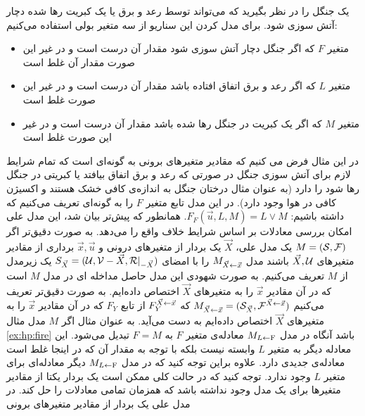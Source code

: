 \begin{example}
      \label{ex:hp:fire}
      یک جنگل را در نظر بگیرید که می‌تواند توسط رعد و برق یا یک کبریت رها شده دچار آتش سوزی شود.
      برای مدل کردن این سناریو از سه متغیر بولی
      استفاده می‌کنیم:
      \begin{itemize}
            \item متغیر
                  $F$
                  که اگر جنگل دچار آتش سوزی شود مقدار آن درست است و در غیر این صورت مقدار آن غلط است
            \item متغیر
                  $L$
                  که اگر رعد و برق اتفاق افتاده باشد مقدار آن درست است و در غیر این صورت غلط است
            \item متغیر
                  $M$
                  که اگر یک کبریت در جنگل رها شده باشد مقدار آن درست است و در غیر این صورت غلط است
      \end{itemize}
\end{example}
در این مثال فرض می کنیم که مقادیر متغیر‌های برونی به گونه‌ای است که تمام شرایط لازم برای آتش سوزی جنگل در صورتی که رعد و برق اتفاق بیافتد یا کبریتی در جنگل رها شود را دارد
(به عنوان مثال درختان جنگل به اندازه‌ی کافی خشک هستند و اکسیژن کافی در هوا وجود دارد).
در این مدل تابع متغیر
$F$
را به گونه‌ای تعریف می‌کنیم که داشته باشیم:
$F_F(\vec u, L , M) = L \vee M$.
همانطور که پیش‌تر بیان شد، این مدل علی امکان بررسی معادلات بر اساس شرایط خلاف واقع را می‌دهد.
به صورت دقیق‌تر اگر
$M = (\mathcal{S},\mathcal{F})$
یک مدل علی،
$\vec X$
یک بردار از متغیرهای درونی و
$\vec{x}, \vec{u}$
برداری از مقادیر متغیر‌های
$\vec{X},\mathcal{U}$
باشند
مدل
$M_{\vec{X}\leftarrow \vec{x}}$
را با امضای
$S_{\vec X}=(\mathcal{U},\mathcal{V}-\vec X,\mathcal{R}|_{\mathcal{-} \vec{X}})$
یک زیرمدل
از
$M$
تعریف می‌کنیم.
به صورت شهودی این مدل حاصل مداخله‌
ای در مدل
$M$
است که در آن مقادیر
$\vec{x}$
را به متغیر‌های
$\vec{X}$
اختصاص داده‌ایم.
به صورت دقیق‌تر تعریف می‌کنیم
$M_{\vec{X}\leftarrow\vec{x}} = (\mathcal{S}_{\vec{X}},\mathcal{F}^{\vec{X}\leftarrow\vec{x}})$
که
$F_Y^{\vec{X}\leftarrow\vec{x}}$
از تابع
$F_Y$
که در آن مقادیر
$\vec{x}$
را به متغیرهای
$\vec{X}$
اختصاص داده‌ایم به دست می‌آید.
به عنوان مثال اگر
$M$
مدل مثال
\ref{ex:hp:fire}
باشد آنگاه در مدل
$M_{L\leftarrow \mathrm{F}}$
معادله‌ی متغیر
$F$
به
$F = M$
تبدیل می‌شود.
این معادله دیگر به متغیر
$L$
وابسته نیست بلکه با توجه به مقدار آن که در اینجا غلط است معادله‌ی جدیدی دارد.
علاوه براین توجه کنید که در مدل
$M_{L\leftarrow \mathrm{F}}$
دیگر معادله‌ای برای متغیر
$L$
وجود ندارد.
توجه کنید که در حالت کلی ممکن است یک بردار یکتا از مقادیر متغیر‌ها برای یک مدل وجود نداشته باشد که همزمان تمامی معادلات را حل کند.
در مدل علی یک بردار از مقادیر متغیر‌های برونی
